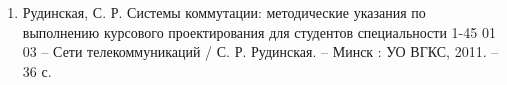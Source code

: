 
\begin{enumerate}[{label=\arabic{*}}]
    \item Рудинская, С. Р. Системы коммутации:
          методические указания по выполнению курсового проектирования
          для студентов специальности 1-45 01 03 --
          Сети телекоммуникаций / С. Р. Рудинская. -- Минск : УО ВГКС,
          2011. -- 36 с.
          \label{book:Methodical Book}
\end{enumerate}
